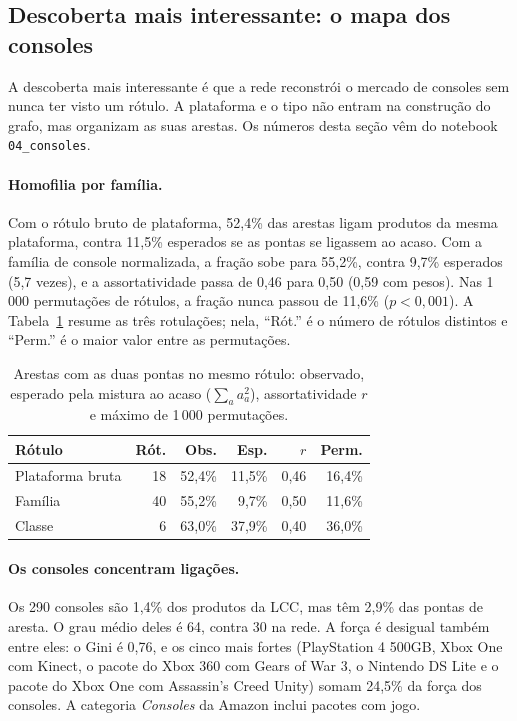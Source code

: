 \documentclass[sigconf,nonacm]{webmedia}
\begin{document}
\subsection{Descoberta mais interessante: o mapa dos consoles}
\label{sec:consoles}

A descoberta mais interessante é que a rede reconstrói o mercado de
consoles sem nunca ter visto um rótulo. A plataforma e o tipo não
entram na construção do grafo, mas organizam as suas arestas. Os
números desta seção vêm do notebook \texttt{04\_consoles}.

\paragraph{Homofilia por família.}
Com o rótulo bruto de plataforma, 52,4\% das arestas ligam produtos
da mesma plataforma, contra 11,5\% esperados se as pontas se ligassem
ao acaso. Com a família de console normalizada, a fração sobe para
55,2\%, contra 9,7\% esperados (5,7 vezes), e a assortatividade passa
de 0,46 para 0,50 (0,59 com pesos). Nas 1\,000 permutações de rótulos,
a fração nunca passou de 11,6\% (\(p<0{,}001\)). A Tabela~\ref{tab:homofilia}
resume as três rotulações; nela, ``Rót.'' é o número de rótulos
distintos e ``Perm.'' é o maior valor entre as permutações.

\begin{table}[tbp]
\centering
\caption{Arestas com as duas pontas no mesmo rótulo: observado, esperado pela mistura ao acaso (\(\sum_a a_a^2\)), assortatividade \(r\) e máximo de 1\,000 permutações.}
\label{tab:homofilia}
\small
\setlength{\tabcolsep}{3.5pt}
\begin{tabular}{@{}lrrrrr@{}}
\toprule
Rótulo & Rót. & Obs. & Esp. & \(r\) & Perm. \\
\midrule
Plataforma bruta & 18 & 52,4\% & 11,5\% & 0,46 & 16,4\% \\
Família & 40 & 55,2\% & 9,7\% & 0,50 & 11,6\% \\
Classe & 6 & 63,0\% & 37,9\% & 0,40 & 36,0\% \\
\bottomrule
\end{tabular}
\end{table}

\paragraph{Os consoles concentram ligações.}
Os 290 consoles são 1,4\% dos produtos da LCC, mas têm 2,9\% das
pontas de aresta. O grau médio deles é 64, contra 30 na rede. A força é desigual também
entre eles: o Gini é 0,76, e os cinco mais fortes (PlayStation 4
500GB, Xbox One com Kinect, o pacote do Xbox 360 com Gears of War 3,
o Nintendo DS Lite e o pacote do Xbox One com Assassin's Creed Unity)
somam 24,5\% da força dos consoles. A categoria \emph{Consoles} da
Amazon inclui pacotes com jogo.
\end{document}
